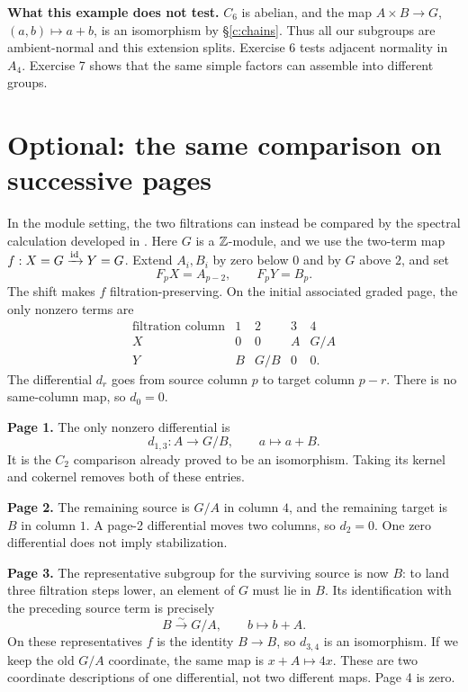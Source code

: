 \textbf{What this example does not test.}
\(C_6\) is abelian, and the map \(A\times B\to G\), \((a,b)\mapsto a+b\),
is an isomorphism by §\ref{c:chains}. Thus all our subgroups are
ambient-normal and this extension splits. Exercise 6 tests adjacent
normality in \(A_4\). Exercise 7 shows that the same simple factors can
assemble into different groups.


\clearpage
\section{Optional: the same comparison on successive pages}\label{c:spectral}
In the module setting, the two filtrations can instead be compared by
the spectral calculation developed in .
Here \(G\) is a \(\mathbb Z\)-module, and we use the two-term map
\(f:X=G\xrightarrow{\mathrm{id}}Y=G\).
Extend \(A_i,B_i\) by zero below \(0\) and by \(G\) above \(2\), and set
\[
 F_pX=A_{p-2},\qquad F_pY=B_p.
\]
The shift makes \(f\) filtration-preserving. On the initial associated
graded page, the only nonzero terms are
\[
\begin{array}{c|cccc}
 \text{filtration column}&1&2&3&4\\ \hline
 X&0&0&A&G/A\\
 Y&B&G/B&0&0 .
\end{array}
\]
The differential \(d_r\) goes from source column \(p\) to target column
\(p-r\). There is no same-column map, so \(d_0=0\).

\textbf{Page 1.}
The only nonzero differential is
\[
 d_{1,3}:A\longrightarrow G/B,\qquad a\longmapsto a+B.
\]
It is the \(C_2\) comparison already proved to be an isomorphism.
Taking its kernel and cokernel removes both of these entries.

\textbf{Page 2.}
The remaining source is \(G/A\) in column \(4\), and the remaining
target is \(B\) in column \(1\). A page-2 differential moves two columns,
so \(d_2=0\). One zero differential does not imply stabilization.

\textbf{Page 3.}
The representative subgroup for the surviving source is now \(B\):
to land three filtration steps lower, an element of \(G\) must lie in
\(B\). Its identification with the preceding source term is precisely
\[
 B\xrightarrow{\sim}G/A,\qquad b\longmapsto b+A.
\]
On these representatives \(f\) is the identity \(B\to B\), so
\(d_{3,4}\) is an isomorphism. If we keep the old \(G/A\) coordinate,
the same map is \(x+A\mapsto4x\). These are two coordinate descriptions
of one differential, not two different maps. Page 4 is zero.


